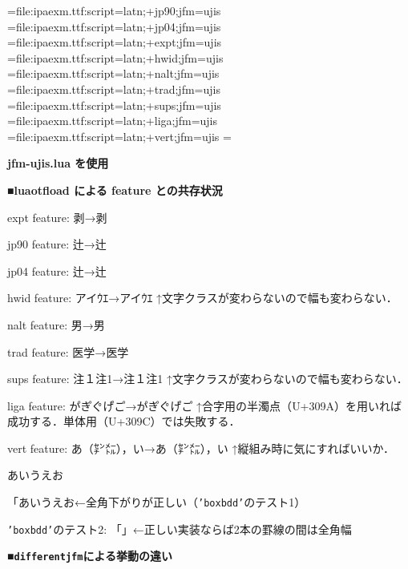 

\jfont\jisninety={file:ipaexm.ttf:script=latn;+jp90;jfm=ujis}
\jfont\jisfour={file:ipaexm.ttf:script=latn;+jp04;jfm=ujis}
\jfont\jisexpt={file:ipaexm.ttf:script=latn;+expt;jfm=ujis}
\jfont\jishwid={file:ipaexm.ttf:script=latn;+hwid;jfm=ujis}
\jfont\jisnalt={file:ipaexm.ttf:script=latn;+nalt;jfm=ujis}
\jfont\jistrad={file:ipaexm.ttf:script=latn;+trad;jfm=ujis}
\jfont\jissups={file:ipaexm.ttf:script=latn;+sups;jfm=ujis}
\jfont\jisliga={file:ipaexm.ttf:script=latn;+liga;jfm=ujis}
\jfont\jisvert={file:ipaexm.ttf:script=latn;+vert;jfm=ujis}
\parskip=\smallskipamount{}\zw

{\noindent\bf\tengt jfm-ujis.lua を使用}

\bigskip

{\noindent\bf\tengt ■luaotf\/load による feature との共存状況}

{\tentt expt} feature: 剥→{\jisexpt 剥}

{\tentt jp90} feature: 辻→{\jisninety 辻}

{\tentt jp04} feature: 辻→{\jisfour 辻}

{\tentt hwid} feature: アイｳｴ→{\jishwid アイｳｴ}\hfil\break
↑文字クラスが変わらないので幅も変わらない．

{\tentt nalt} feature: 男→{\jisnalt 男}

{\tentt trad} feature: 医学→{\jistrad 医学}

{\tentt sups} feature: 注１注1→{\jissups 注１注1}\hfil\break
↑文字クラスが変わらないので幅も変わらない．

{\tentt liga} feature: か゚き゚く゚け゚こ゚→{\jisliga か゚き゚く゚け゚こ゚}\hfil\break
↑合字用の半濁点（{\tentt U+309A}）を用いれば成功する．単体用（{\tentt U+309C}）では失敗する．%

{\tentt vert} feature: あ（㌢㍍），い→{\jisvert あ（㌢㍍），い}\hfil\break
↑縦組み時に気にすればいいか．

\bigskip

\noindent あいうえお

「あいうえお←全角下がりが正しい（{\tt'boxbdd'}のテスト1）

{\tt'boxbdd'}のテスト2: \vrule\hbox{「」}\vrule ←正しい実装ならば2本の罫線の間は全角幅


\bigskip
{\noindent\bf\tengt ■{\tt differentjfm}による挙動の違い}

